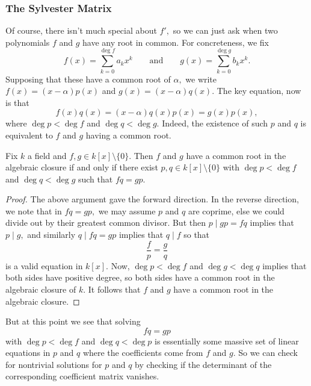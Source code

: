 \subsubsection{The Sylvester Matrix}
Of course, there isn't much special about $f',$ so we can just ask when two polynomials $f$ and $g$ have any root in common. For concreteness, we fix
\[f(x)=\sum_{k=0}^{\deg f}a_kx^k\qquad\text{and}\qquad g(x)=\sum_{k=0}^{\deg g}b_kx^k.\]
Supposing that these have a common root of $\alpha,$ we write $f(x)=(x-\alpha)p(x)$ and $g(x)=(x-\alpha)q(x).$ The key equation, now is that
\[f(x)q(x)=(x-\alpha)q(x)p(x)=g(x)p(x),\]
where $\deg p<\deg f$ and $\deg q<\deg g.$ Indeed, the existence of such $p$ and $q$ is equivalent to $f$ and $g$ having a common root.
\begin{lemma}
	Fix $k$ a field and $f,g\in k[x]\setminus\{0\}.$ Then $f$ and $g$ have a common root in the algebraic closure if and only if there exist $p,q\in k[x]\setminus\{0\}$ with $\deg p<\deg f$ and $\deg q<\deg g$ such that $fq=gp.$
\end{lemma}
\begin{proof}
	The above argument gave the forward direction. In the reverse direction, we note that in $fq=gp,$ we may assume $p$ and $q$ are coprime, else we could divide out by their greatest common divisor. But then $p\mid gp=fq$ implies that $p\mid g,$ and similarly $q\mid fq=gp$ implies that $q\mid f$ so that
	\[\frac fp=\frac gq\]
	is a valid equation in $k[x].$ Now, $\deg p<\deg f$ and $\deg g<\deg q$ implies that both sides have positive degree, so both sides have a common root in the algebraic closure of $k.$ It follows that $f$ and $g$ have a common root in the algebraic closure.
\end{proof}
But at this point we see that solving
\[fq=gp\]
with $\deg p<\deg f$ and $\deg q<\deg p$ is essentially some massive set of linear equations in $p$ and $q$ where the coefficients come from $f$ and $g.$ So we can check for nontrivial solutions for $p$ and $q$ by checking if the determinant of the corresponding coefficient matrix vanishes.

